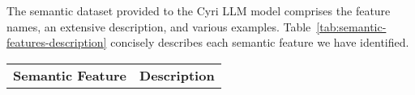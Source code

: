 The semantic dataset provided to the Cyri LLM model comprises the feature names, an extensive description, and various examples. Table~\ref{tab:semantic-features-description} concisely describes each semantic feature we have identified.
\begin{table*}[ht]
\centering
\caption{Cyri Semantic Features Description}
\label{tab:semantic-features-description}
\begin{tabular}{|p{4cm}|p{12cm}|} %
\hline
\textbf{Semantic Feature} & \textbf{Description} \\ %


\end{tabular}
\end{table*}
